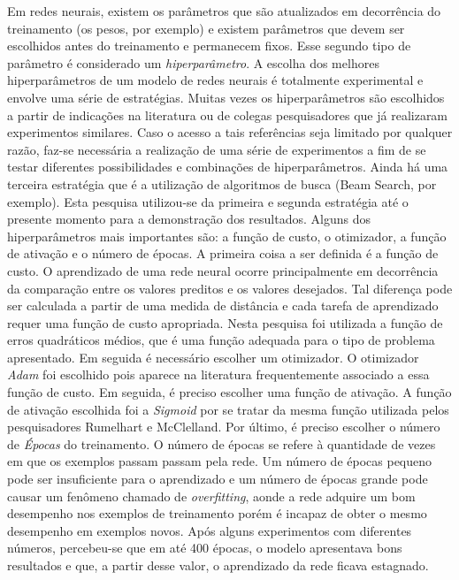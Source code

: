 Em redes neurais, existem os parâmetros que são atualizados em decorrência do treinamento (os pesos, por exemplo) e existem parâmetros que devem ser escolhidos antes do treinamento e permanecem fixos. Esse segundo tipo de parâmetro é considerado um \textit{hiperparâmetro}. A escolha dos melhores hiperparâmetros de um modelo de redes neurais é totalmente experimental e envolve uma série de estratégias. Muitas vezes os hiperparâmetros são escolhidos a partir de indicações na literatura ou de colegas pesquisadores que já realizaram experimentos similares. Caso o acesso a tais referências seja limitado por qualquer razão, faz-se necessária a realização de uma série de experimentos a fim de se testar diferentes possibilidades e combinações de hiperparâmetros. Ainda há uma terceira estratégia que é a utilização de algoritmos de busca (Beam Search, por exemplo). Esta pesquisa utilizou-se da primeira e segunda estratégia até o presente momento para a demonstração dos resultados. Alguns dos hiperparâmetros mais importantes são: a função de custo, o otimizador, a função de ativação e o número de épocas. A primeira coisa a ser definida é a função de custo. O aprendizado de uma rede neural ocorre principalmente em decorrência da comparação entre os valores preditos e os valores desejados. Tal diferença pode ser calculada a partir de uma medida de distância e cada tarefa de aprendizado requer uma função de custo apropriada. Nesta pesquisa foi utilizada a função de erros quadráticos médios, que é uma função adequada para o tipo de problema apresentado. Em seguida é necessário escolher um otimizador. O otimizador \textit{Adam} foi escolhido pois aparece na literatura frequentemente associado a essa função de custo. Em seguida, é preciso escolher uma função de ativação. A função de ativação escolhida foi a \textit{Sigmoid} por se tratar da mesma função utilizada pelos pesquisadores Rumelhart e McClelland. Por último, é preciso escolher o número de \textit{Épocas} do treinamento. O número de épocas se refere à quantidade de vezes em que os exemplos passam passam pela rede. Um número de épocas pequeno pode ser insuficiente para o aprendizado e um número de épocas grande pode causar um fenômeno chamado de \textit{overfitting}, aonde a rede adquire um bom desempenho nos exemplos de treinamento porém é incapaz de obter o mesmo desempenho em exemplos novos. Após alguns experimentos com diferentes números, percebeu-se que em até 400 épocas, o modelo apresentava bons resultados e que, a partir desse valor, o aprendizado da rede ficava estagnado.

